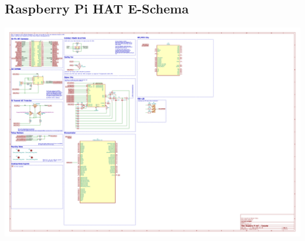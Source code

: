 \subsection{Raspberry Pi HAT E-Schema}\label{ah_hat}
\includegraphics*[width=1.4\textwidth,angle=270]{pdf/rpi-hat-eschema.pdf}
\newpage